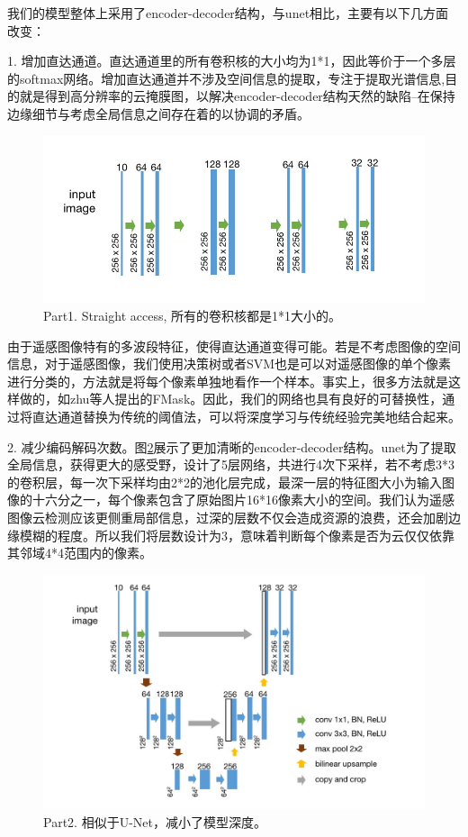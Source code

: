 \documentclass[UTF8]{ctexart}
\begin{document}
我们的模型整体上采用了encoder-decoder结构，与unet相比，主要有以下几方面改变：

1. 增加直达通道。直达通道里的所有卷积核的大小均为1*1，因此等价于一个多层的softmax网络。增加直达通道并不涉及空间信息的提取，专注于提取光谱信息,目的就是得到高分辨率的云掩膜图，以解决encoder-decoder结构天然的缺陷--在保持边缘细节与考虑全局信息之间存在着的以协调的矛盾。

\begin{figure}[H]
    \centering
    \includegraphics[scale=0.3]{../pic/straight.jpg}
    \caption[]{Part1. Straight access, 所有的卷积核都是1*1大小的。}
    \label{pic:straight}
\end{figure}

由于遥感图像特有的多波段特征，使得直达通道变得可能。若是不考虑图像的空间信息，对于遥感图像，我们使用决策树或者SVM也是可以对遥感图像的单个像素进行分类的，方法就是将每个像素单独地看作一个样本。事实上，很多方法就是这样做的，如zhu等人提出的FMask\cite{zhu2012object}。因此，我们的网络也具有良好的可替换性，通过将直达通道替换为传统的阈值法，可以将深度学习与传统经验完美地结合起来。

2. 减少编码解码次数。图\ref{pic:part2}展示了更加清晰的encoder-decoder结构。unet为了提取全局信息，获得更大的感受野，设计了5层网络，共进行4次下采样，若不考虑3*3的卷积层，每一次下采样均由2*2的池化层完成，最深一层的特征图大小为输入图像的十六分之一，每个像素包含了原始图片16*16像素大小的空间。我们认为遥感图像云检测应该更侧重局部信息，过深的层数不仅会造成资源的浪费，还会加剧边缘模糊的程度。所以我们将层数设计为3，意味着判断每个像素是否为云仅仅依靠其邻域4*4范围内的像素。

\begin{figure}[H]
    \centering
    \includegraphics[scale=0.3]{../pic/part2.jpg}
    \caption[]{Part2. 相似于U-Net，减小了模型深度。}
    \label{pic:part2}
\end{figure}
\end{document}
